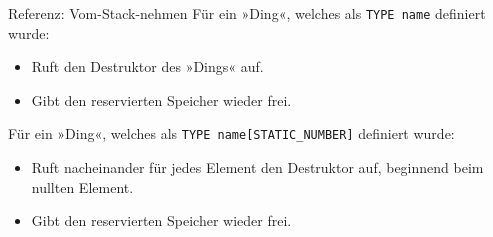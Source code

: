 {
\begin{frame}[fragile]{Referenz: Vom-Stack-nehmen}
	Für ein »Ding«, welches als \verb|TYPE name| definiert wurde:
	\begin{itemize}
		\item Ruft den Destruktor des »Dings« auf.
		\item Gibt den reservierten Speicher wieder frei.
	\end{itemize}
	
	\vspace{2em}
	
	Für ein »Ding«, welches als \verb|TYPE name[STATIC_NUMBER]| definiert wurde:
	\begin{itemize}
		\item Ruft nacheinander für jedes Element den Destruktor auf, beginnend beim nullten Element.
		\item Gibt den reservierten Speicher wieder frei.
	\end{itemize}
\end{frame}
}










